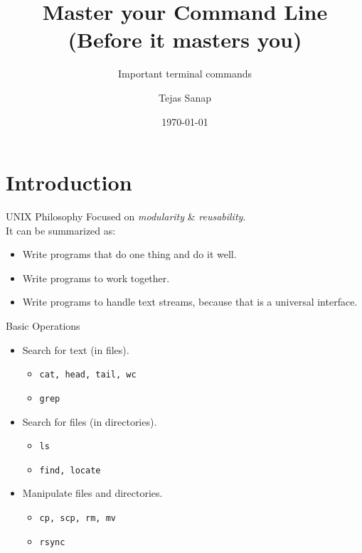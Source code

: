 \documentclass[11pt]{beamer}
\title[PLUG Meetup]{Master your Command Line \\ \small{(Before it masters you)} }
\subtitle{\large{Important terminal commands}}
\author{Tejas Sanap}
\date{\today}
\begin{document}
	\begin{frame}
		\titlepage
	\end{frame}
	\begin{frame}
		\tableofcontents
	\end{frame}

	\section{Introduction}
		\begin{frame}{UNIX Philosophy}
			Focused on \emph{modularity} \& \emph{reusability}. \\
			It can be summarized as:
			\begin{itemize}
				\item Write programs that do one thing and do it well.
				\item Write programs to work together.
				\item Write programs to handle text streams, because that is a universal interface.
			\end{itemize}
		\end{frame}

		\begin{frame}{Basic Operations}
			\begin{itemize}
				\item Search for text (in files).
					\begin{itemize}
						\item \texttt{cat, head, tail, wc}
						\item \texttt{grep}
					\end{itemize}
				\item Search for files (in directories).
					\begin{itemize}
						\item \texttt{ls}
						\item \texttt{find, locate}
					\end{itemize}
				\item Manipulate files and directories.
					\begin{itemize}
						\item \texttt{cp, scp, rm, mv}
						\item \texttt{rsync}
					\end{itemize}
			\end{itemize}			
		\end{frame}
\end{document}
